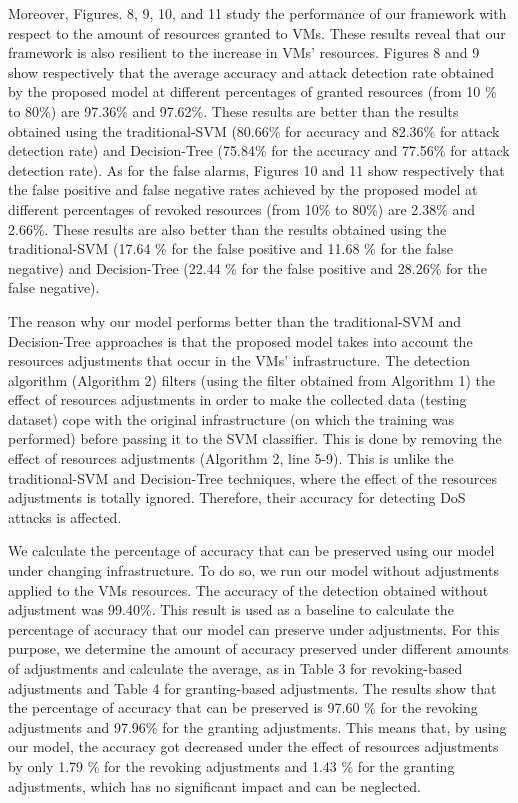 \documentclass[twocolumn]{bmcart}%
\begin{document}
Moreover, Figures. 8, 9, 10, and 11 study the performance of our framework with respect to the amount of resources granted to VMs. These results reveal that our framework is also resilient to the increase in VMs' resources. Figures 8 and 9 show respectively that the average accuracy and attack detection rate obtained by the proposed model at different percentages of granted resources (from 10 \% to 80\%) are 97.36\% and 97.62\%. These results are better than the results obtained using the traditional-SVM (80.66\% for accuracy and 82.36\% for attack detection rate) and Decision-Tree (75.84\% for the accuracy and 77.56\% for attack detection rate). As for the false alarms, Figures 10 and 11 show respectively that the false positive and false negative rates achieved by the proposed model at different percentages of revoked resources (from 10\% to 80\%) are 2.38\% and 2.66\%. These results are also better than the results obtained using the traditional-SVM (17.64 \% for the false positive and 11.68 \% for the false negative) and Decision-Tree (22.44 \% for the false positive and 28.26\% for the false negative).

The reason why our model performs better than the traditional-SVM and Decision-Tree approaches is that the proposed model takes into account the resources adjustments that occur in the VMs' infrastructure. The detection algorithm (Algorithm 2) filters (using the filter obtained from Algorithm 1) the effect of resources adjustments in order to make the collected data (testing dataset) cope with the original infrastructure (on which the training was performed) before passing it to the SVM classifier. This is done by removing the effect of resources adjustments (Algorithm 2, line 5-9). This is unlike the traditional-SVM and Decision-Tree techniques, where the effect of the resources adjustments is totally ignored. Therefore, their accuracy for detecting DoS attacks is affected.

We calculate the percentage of accuracy that can be preserved using our model under changing infrastructure. To do so, we run our model without adjustments applied to the VMs resources. The accuracy of the detection obtained without adjustment was 99.40\%. This result is used as a baseline to calculate the percentage of accuracy that our model can preserve under adjustments. For this purpose, we determine the amount of accuracy preserved under different amounts of adjustments and calculate the average, as in Table 3 for revoking-based adjustments and Table 4 for granting-based adjustments. The results show that the percentage of accuracy that can be preserved is 97.60 \% for the revoking adjustments and 97.96\% for the granting adjustments. This means that, by using our model, the accuracy got decreased under the effect of resources adjustments by only 1.79 \%  for the revoking adjustments and 1.43 \% for the granting adjustments, which has no significant impact and can be neglected.
\end{document}
